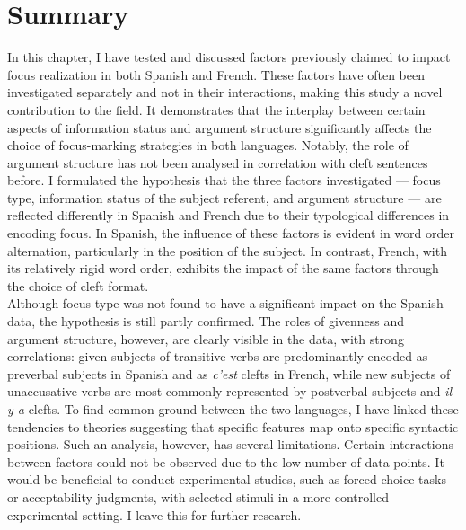 \section{Summary}
In this chapter, I have tested and discussed factors previously claimed to impact focus realization in both Spanish and French. These factors have often been investigated separately and not in their interactions, making this study a novel contribution to the field. It demonstrates that the interplay between certain aspects of information status and argument structure significantly affects the choice of focus-marking strategies in both languages. Notably, the role of argument structure has not been analysed in correlation with cleft sentences before.
I formulated the hypothesis that the three factors investigated — focus type, information status of the subject referent, and argument structure — are reflected differently in Spanish and French due to their typological differences in encoding focus. In Spanish, the influence of these factors is evident in word order alternation, particularly in the position of the subject. In contrast, French, with its relatively rigid word order, exhibits the impact of the same factors through the choice of cleft format.\\
Although focus type was not found to have a significant impact on the Spanish data, the hypothesis is still partly confirmed. The roles of givenness and argument structure, however, are clearly visible in the data, with strong correlations: given subjects of transitive verbs are predominantly encoded as preverbal subjects in Spanish and as \textit{c'est} clefts in French, while new subjects of unaccusative verbs are most commonly represented by postverbal subjects and \textit{il y a} clefts.
To find common ground between the two languages, I have linked these tendencies to theories suggesting that specific features map onto specific syntactic positions. Such an analysis, however, has several limitations. Certain interactions between factors could not be observed due to the low number of data points. It would be beneficial to conduct experimental studies, such as forced-choice tasks or acceptability judgments, with selected stimuli in a more controlled experimental setting. I leave this for further research.
